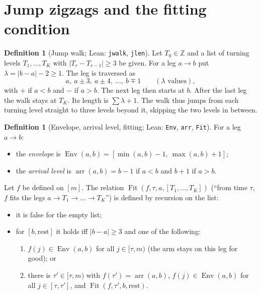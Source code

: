 \documentclass[11pt]{article}
\theoremstyle{definition}
\newtheorem{definition}[theorem]{Definition}
\theoremstyle{remark}
\newcommand{\Z}{\mathbb{Z}}
\newcommand{\Env}{\operatorname{Env}}
\newcommand{\arr}{\operatorname{arr}}
\newcommand{\Fit}{\operatorname{Fit}}
\newcommand{\lean}[1]{\texttt{#1}}
\begin{document}
\section{Jump zigzags and the fitting condition}\label{sec:jump}

\begin{definition}[Jump walk; Lean: \lean{jwalk}, \lean{jlen}]
Let $T_0\in\Z$ and a list of turning levels $T_1,\dots,T_K$ with
$|T_{r}-T_{r-1}|\ge3$ be given. For a leg $a\to b$ put $\lambda=|b-a|-2\ge1$.
The leg is traversed as
\[
a,\ a\pm3,\ a\pm4,\ \dots,\ b\mp1\qquad(\lambda\text{ values}),
\]
with $+$ if $a<b$ and $-$ if $a>b$. The next leg then starts at $b$. After the
last leg the walk stays at $T_K$. Its length is $\sum\lambda+1$.
The walk thus jumps from each turning level straight to three levels beyond
it, skipping the two levels in between.
\end{definition}

\begin{definition}[Envelope, arrival level, fitting; Lean: \lean{Env},
\lean{arr}, \lean{Fit}]
For a leg $a\to b$:
\begin{itemize}
\item the \emph{envelope} is $\Env(a,b)=[\min(a,b)-1,\ \max(a,b)+1]$;
\item the \emph{arrival level} is $\arr(a,b)=b-1$ if $a<b$ and $b+1$ if $a>b$.
\end{itemize}
Let $f$ be defined on $[m]$. The relation $\Fit(f,\tau,a,[T_1,\dots,T_K])$
(``from time $\tau$, $f$ fits the legs $a\to T_1\to\dots\to T_K$'') is defined
by recursion on the list:
\begin{itemize}
\item it is false for the empty list;
\item for $[b,\text{rest}]$ it holds iff $|b-a|\ge3$ and one of the following:
  \begin{enumerate}[label=(\roman*)]
  \item $f(j)\in\Env(a,b)$ for all $j\in[\tau,m)$ (the arm stays on this leg
  for good); or
  \item there is $\tau'\in[\tau,m)$ with $f(\tau')=\arr(a,b)$,
  $f(j)\in\Env(a,b)$ for all $j\in[\tau,\tau']$, and
  $\Fit(f,\tau',b,\text{rest})$.
  \end{enumerate}
\end{itemize}
\end{definition}
\end{document}
